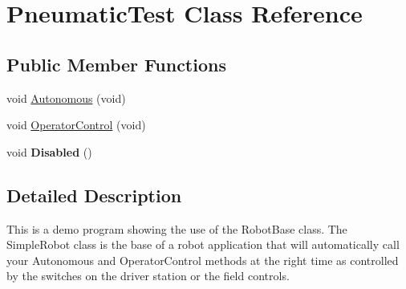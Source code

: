 \hypertarget{class_pneumatic_test}{\section{Pneumatic\-Test Class Reference}
\label{class_pneumatic_test}
}
\subsection*{Public Member Functions}
\begin{DoxyCompactItemize}
\item 
void \hyperlink{class_pneumatic_test_aedd0331dfee430545e6f77359c55f49c}{Autonomous} (void)
\item 
void \hyperlink{class_pneumatic_test_a66a59497cdbd504df462c8b2820617e8}{Operator\-Control} (void)
\item 
\hypertarget{class_pneumatic_test_afad611bfbbf3a85466d034bef3591bd1}{void {\bfseries Disabled} ()}\label{class_pneumatic_test_afad611bfbbf3a85466d034bef3591bd1}

\end{DoxyCompactItemize}


\subsection{Detailed Description}
This is a demo program showing the use of the Robot\-Base class. The Simple\-Robot class is the base of a robot application that will automatically call your Autonomous and Operator\-Control methods at the right time as controlled by the switches on the driver station or the field controls. 

